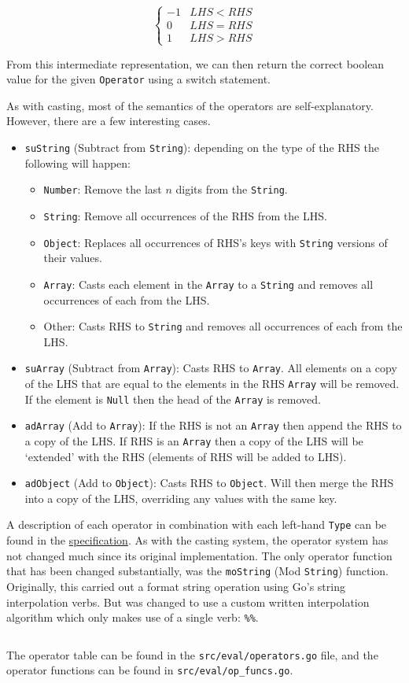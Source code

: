 \[ \begin{cases} 
    -1 & LHS < RHS \\
    0  & LHS = RHS \\
    1  & LHS > RHS 
 \end{cases}
\]

From this intermediate representation, we can then return the correct boolean value for the given \verb|Operator| using a switch statement.

As with casting, most of the semantics of the operators are self-explanatory. However, there are a few interesting cases.

\begin{itemize}
    \item \verb|suString| (Subtract from \verb|String|): depending on the type of the RHS the following will happen:
    \begin{itemize}
        \item \verb|Number|: Remove the last $n$ digits from the \verb|String|.
        \item \verb|String|: Remove all occurrences of the RHS from the LHS.
        \item \verb|Object|: Replaces all occurrences of RHS's keys with \verb|String| versions of their values.
        \item \verb|Array|: Casts each element in the \verb|Array| to a \verb|String| and removes all occurrences of each from the LHS.
        \item Other: Casts RHS to \verb|String| and removes all occurrences of each from the LHS.
    \end{itemize}
    \item \verb|suArray| (Subtract from \verb|Array|): Casts RHS to \verb|Array|. All elements on a copy of the LHS that are equal to the elements in the RHS \verb|Array| will be removed. If the element is \verb|Null| then the head of the \verb|Array| is removed.
    \item \verb|adArray| (Add to \verb|Array|): If the RHS is not an \verb|Array| then append the RHS to a copy of the LHS. If RHS is an \verb|Array| then a copy of the LHS will be `extended' with the RHS (elements of RHS will be added to LHS).
    \item \verb|adObject| (Add to \verb|Object|): Casts RHS to \verb|Object|. Will then merge the RHS into a copy of the LHS, overriding any values with the same key.
\end{itemize}

A description of each operator in combination with each left-hand \verb|Type| can be found in the \hyperref[sec:operatorvaluerel]{specification}. As with the casting system, the operator system has not changed much since its original implementation. The only operator function that has been changed substantially, was the \verb|moString| (Mod \verb|String|) function. Originally, this carried out a format string operation using Go's string interpolation verbs\textsuperscript{\cite{go_fmt_package}}. But was changed to use a custom written interpolation algorithm which only makes use of a single verb: \verb|%%|.

\inputminted[firstline=185, lastline=233, autogobble, breaklines, tabsize=4]{go}{../../src/eval/op_funcs.go}

The operator table can be found in the \verb|src/eval/operators.go| file, and the operator functions can be found in \verb|src/eval/op_funcs.go|.
